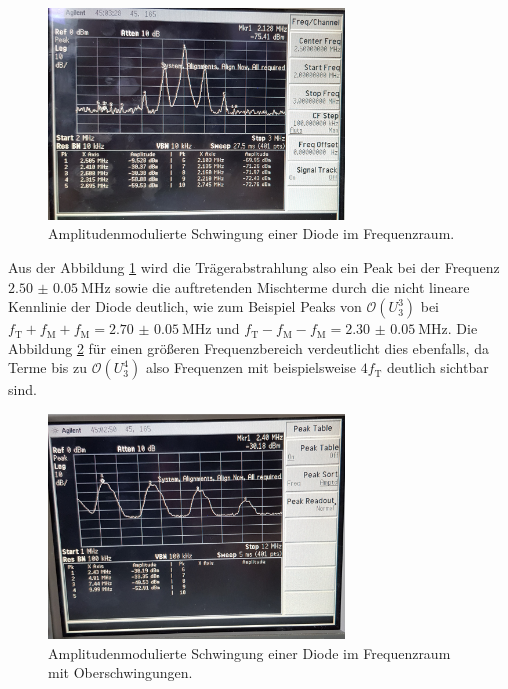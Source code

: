 \begin{figure}
  \centering
  \includegraphics[width=0.7\textwidth]{spec/frequenzbereich_klein_diode.jpg}
  \caption{Amplitudenmodulierte
Schwingung einer Diode im Frequenzraum.}
  \label{fig:diode_frequenz_klein}
\end{figure}
Aus der Abbildung \ref{fig:diode_frequenz_klein}
wird die Trägerabstrahlung also
ein Peak bei der Frequenz $\SI{2.50(5)}{\mega\hertz}$
sowie
die auftretenden Mischterme durch die nicht lineare
Kennlinie
der Diode deutlich,
wie zum Beispiel Peaks von $\mathcal{O}\left(U_{3}^3\right)$ bei $f_{\text{T}}+f_{\text{M}}+f_{\text{M}} = \SI{2.70(5)}{\mega\hertz}$
und $f_{\text{T}}-f_{\text{M}}-f_{\text{M}} = \SI{2.30(5)}{\mega\hertz}$.
Die Abbildung \ref{fig:diode_frequenz_gross}
für einen größeren Frequenzbereich
verdeutlicht dies ebenfalls, da Terme bis
zu $\mathcal{O}\left(U_{3}^4\right)$
also Frequenzen mit beispielsweise $4f_{\text{T}}$
deutlich sichtbar sind.
\begin{figure}
  \centering
  \includegraphics[width=0.7\textwidth]{spec/frequenzbereich_gross_diode.jpg}
  \caption{Amplitudenmodulierte
Schwingung einer Diode im Frequenzraum mit Oberschwingungen.}
\label{fig:diode_frequenz_gross}
\end{figure}

